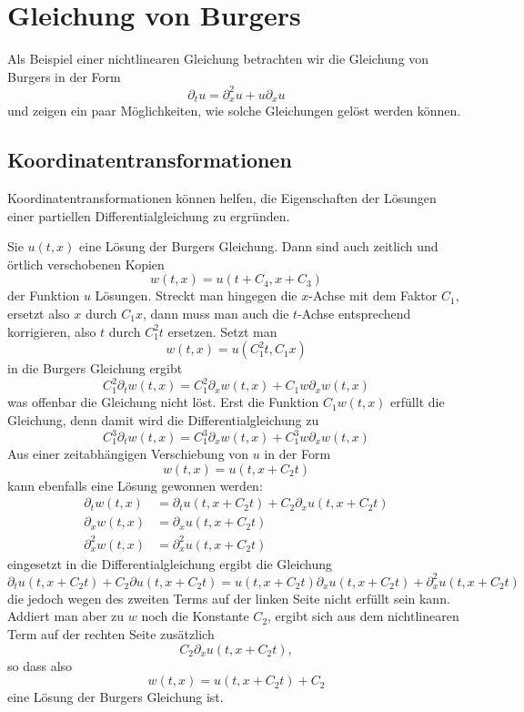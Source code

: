 %
%
%
\section{Gleichung von Burgers\label{burgers}}
Als Beispiel einer nichtlinearen Gleichung betrachten wir die Gleichung
von Burgers in der Form
\[
\partial_t u=\partial_x^2u+u\partial_xu
\]
und zeigen ein paar Möglichkeiten, wie solche Gleichungen
gelöst werden können.

\subsection{Koordinatentransformationen}
Koordinatentransformationen können helfen, die Eigenschaften der
Lösungen einer partiellen Differentialgleichung zu ergründen.

Sie $u(t,x)$ eine Lösung der Burgers Gleichung. Dann sind auch
zeitlich und örtlich verschobenen Kopien
\[
w(t,x)=u(t+C_4, x+C_3)
\]
der Funktion $u$ Lösungen.
Streckt man hingegen die $x$-Achse mit dem Faktor $C_1$, ersetzt
also $x$ durch $C_1x$, dann
muss man auch die $t$-Achse entsprechend korrigieren, also $t$
durch $C_1^2t$ ersetzen. Setzt man
\[
w(t,x)=u(C_1^2t,C_1x)
\]
in die Burgers Gleichung ergibt
\[
C_1^2\partial_t w(t,x)=C_1^2\partial_xw(t,x)+C_1w\partial_xw(t,x)
\]
was offenbar die Gleichung nicht löst. Erst die Funktion $C_1w(t,x)$
erfüllt die Gleichung, denn damit wird die Differentialgleichung zu
\[
C_1^3\partial_t w(t,x)=C_1^3\partial_xw(t,x)+C_1^3w\partial_xw(t,x)
\]
Aus einer zeitabhängigen Verschiebung von $u$ in der Form
\[
w(t,x)=u(t,x+C_2t)
\]
kann ebenfalls eine Lösung gewonnen werden:
\begin{align*}
\partial_t w(t,x)&=\partial_t u(t,x+C_2t)+C_2\partial_x u(t,x+C_2t)
\\
\partial_x w(t,x)&=\partial_x u(t,x+C_2t)
\\
\partial_x^2 w(t,x)&=\partial_x^2 u(t,x+C_2t)
\end{align*}
eingesetzt in die Differentialgleichung ergibt die Gleichung
\[
\partial_t u(t,x+C_2t)+C_2\partial u(t,x+C_2t)
=
u(t,x+C_2t)\partial_xu(t,x+C_2t)
+
\partial_x^2 u(t,x+C_2t)
\]
die jedoch wegen des zweiten Terms auf der linken Seite nicht erfüllt
sein kann. Addiert man aber zu $w$ noch die Konstante $C_2$, ergibt sich
aus dem nichtlinearen Term auf der rechten Seite zusätzlich
\[
C_2\partial_xu(t,x+C_2t),
\]
so dass also
\[
w(t,x)=u(t,x+C_2t)+C_2
\]
eine Lösung der Burgers Gleichung ist.

